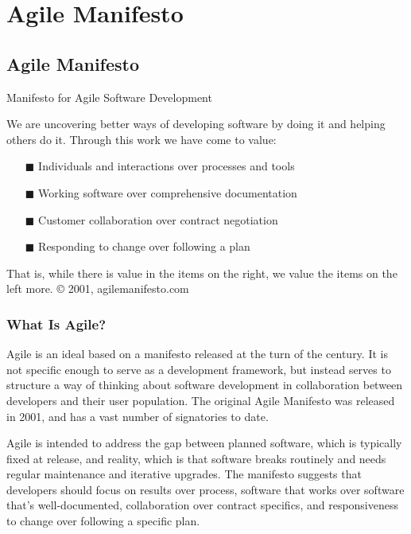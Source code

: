 
\chapter{Agile Manifesto} %

\label{AppendixC} %


\section{Agile Manifesto}

Manifesto for Agile Software Development

We are uncovering better ways of developing software by doing it and helping others do it.
Through this work we have come to value:
\begin{itemize}
\item[\tiny{$\blacksquare$}]  Individuals and interactions over processes and tools
\item[\tiny{$\blacksquare$}]  Working software over comprehensive documentation
\item[\tiny{$\blacksquare$}]  Customer collaboration over contract negotiation
\item[\tiny{$\blacksquare$}]  Responding to change over following a plan
\end{itemize}

That is, while there is value in the items on the right, we value the items on the left more.
© 2001, agilemanifesto.com

\subsection{What Is Agile?}
Agile is an ideal based on a manifesto released at the turn of the century. It is not specific enough to serve as a development framework, but instead serves to structure a way of thinking about software development in collaboration between developers and their user population. The original Agile Manifesto was released in 2001, and has a vast number of signatories to date. 

Agile is intended to address the gap between planned software, which is typically fixed at release, and reality, which is that software breaks routinely and needs regular maintenance and iterative upgrades. The manifesto suggests that developers should focus on results over process, software that works over software that's well-documented, collaboration over contract specifics, and responsiveness to change over following a specific plan.

